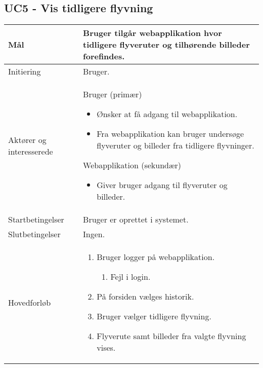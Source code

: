 \subsection*{UC5 - Vis tidligere flyvning}

\begin{table}[H]
\begin{tabular}{| p{3cm}| p{11.5cm}|}
\hline

Mål	 								& Bruger tilgår webapplikation hvor tidligere flyveruter og tilhørende billeder forefindes. \\\hline
Initiering 							& Bruger. \\\hline
Aktører og interesserede			& Bruger (primær) 
										\begin{itemize}
											\item Ønsker at få adgang til webapplikation. 
											\item Fra webapplikation kan bruger undersøge flyveruter og billeder fra tidligere flyvninger.
										\end{itemize} 
									  Webapplikation (sekundær)
										\begin{itemize}
											\item Giver bruger adgang til flyveruter og billeder.
										\end{itemize} \\\hline
Startbetingelser							& Bruger er oprettet i systemet. \\\hline
Slutbetingelser						& Ingen. \\\hline
Hovedforløb				&
 
									\renewcommand{\labelenumi}{\arabic{enumi}.}
									\renewcommand{\labelenumii}{\Roman{enumii}:}

									\begin{enumerate}[topsep=0.0cm, leftmargin=0.5cm]
										\item Bruger logger på webapplikation.
										\begin{enumerate}[partopsep=4cm, topsep=0cm, leftmargin=1cm]
												\item Fejl i login.
										\end{enumerate}
										\item På forsiden vælges historik.
										\item Bruger vælger tidligere flyvning.	
										\item Flyverute samt billeder fra valgte flyvning vises.
									\end{enumerate} \\\hline	


\end{tabular}
\end{table}
